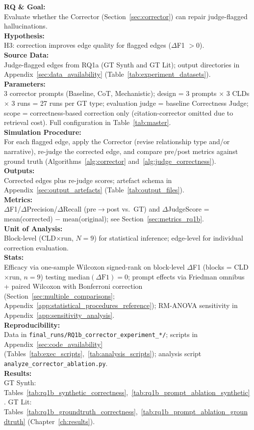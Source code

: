 \noindent\textbf{RQ \& Goal:}\\
Evaluate whether the Corrector (Section~\ref{sec:corrector}) can repair judge-flagged hallucinations.\\
\textbf{Hypothesis:}\\
H3: correction improves edge quality for flagged edges ($\Delta$F1 $> 0$).\\
\textbf{Source Data:}\\
Judge-flagged edges from RQ1a (GT Synth and GT Lit); output directories in Appendix~\ref{sec:data_availability} (Table~\ref{tab:experiment_datasets}).\\
\textbf{Parameters:}\\
3 corrector prompts (Baseline, CoT, Mechanistic); design = 3 prompts $\times$ 3 CLDs $\times$ 3 runs = 27 runs per GT type; evaluation judge = baseline Correctness Judge; scope = correctness-based correction only (citation-corrector omitted due to retrieval cost). Full configuration in Table~\ref{tab:master}.\\
\textbf{Simulation Procedure:}\\
For each flagged edge, apply the Corrector (revise relationship type and/or narrative), re-judge the corrected edge, and compare pre/post metrics against ground truth (Algorithms~\ref{alg:corrector} and~\ref{alg:judge_correctness}).\\
\textbf{Outputs:}\\
Corrected edges plus re-judge scores; artefact schema in Appendix~\ref{sec:output_artefacts} (Table~\ref{tab:output_files}).\\
\textbf{Metrics:}\\
$\Delta$F1/$\Delta$Precision/$\Delta$Recall (pre$\rightarrow$post vs.\ GT) and $\Delta$JudgeScore = mean(corrected) $-$ mean(original); see Section~\ref{sec:metrics_rq1b}.\\
\textbf{Unit of Analysis:}\\
Block-level (CLD$\times$run, $N=9$) for statistical inference; edge-level for individual correction evaluation.\\
\textbf{Stats:}\\
Efficacy via one-sample Wilcoxon signed-rank on block-level $\Delta$F1 (blocks = CLD$\times$run, $n{=}9$) testing median$(\Delta\mathrm{F1})=0$; prompt effects via Friedman omnibus + paired Wilcoxon with Bonferroni correction (Section~\ref{sec:multiple_comparisons}; Appendix~\ref{app:statistical_procedures_reference}); RM-ANOVA sensitivity in Appendix~\ref{app:sensitivity_analysis}.\\
\textbf{Reproducibility:}\\
Data in \texttt{final\_runs/RQ1b\_corrector\_experiment\_*/}; scripts in Appendix~\ref{sec:code_availability} (Tables~\ref{tab:exec_scripts},~\ref{tab:analysis_scripts}); analysis script \texttt{analyze\_corrector\_ablation.py}.\\
\textbf{Results:}\\
GT Synth: Tables~\ref{tab:rq1b_synthetic_correctness},~\ref{tab:rq1b_prompt_ablation_synthetic}. GT Lit: Tables~\ref{tab:rq1b_groundtruth_correctness},~\ref{tab:rq1b_prompt_ablation_groundtruth} (Chapter~\ref{ch:results}).


